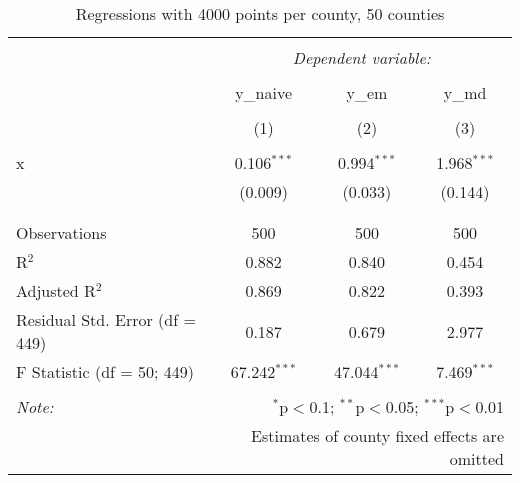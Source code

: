 
\begin{table}[!htbp] \centering 
  \caption{Regressions with 4000 points per county, 50 counties} 
  \label{} 
\begin{tabular}{@{\extracolsep{5pt}}lccc} 
\\[-1.8ex]\hline 
\hline \\[-1.8ex] 
 & \multicolumn{3}{c}{\textit{Dependent variable:}} \\ 
\cline{2-4} 
\\[-1.8ex] & y\_naive & y\_em & y\_md \\ 
\\[-1.8ex] & (1) & (2) & (3)\\ 
\hline \\[-1.8ex] 
 x & 0.106$^{***}$ & 0.994$^{***}$ & 1.968$^{***}$ \\ 
  & (0.009) & (0.033) & (0.144) \\ 
  & & & \\ 
\hline \\[-1.8ex] 
Observations & 500 & 500 & 500 \\ 
R$^{2}$ & 0.882 & 0.840 & 0.454 \\ 
Adjusted R$^{2}$ & 0.869 & 0.822 & 0.393 \\ 
Residual Std. Error (df = 449) & 0.187 & 0.679 & 2.977 \\ 
F Statistic (df = 50; 449) & 67.242$^{***}$ & 47.044$^{***}$ & 7.469$^{***}$ \\ 
\hline 
\hline \\[-1.8ex] 
\textit{Note:}  & \multicolumn{3}{r}{$^{*}$p$<$0.1; $^{**}$p$<$0.05; $^{***}$p$<$0.01} \\ 
 & \multicolumn{3}{r}{Estimates of county fixed effects are omitted} \\ 
\end{tabular} 
\end{table} 
